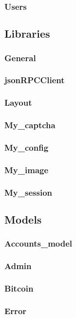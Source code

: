 \documentclass[11pt]{article} %
\begin{document}
\subsubsection*{Users}


\subsection{Libraries}
\subsubsection*{General}
\subsubsection*{jsonRPCClient}
\subsubsection*{Layout}
\subsubsection*{My_captcha}
\subsubsection*{My_config}
\subsubsection*{My_image}
\subsubsection*{My_session}


\subsection{Models}
\subsubsection*{Accounts_model}
\subsubsection*{Admin}
\subsubsection*{Bitcoin}
\subsubsection*{Error}
\end{document}
